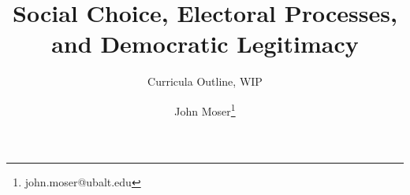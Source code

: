 \documentclass[twoside,titlepage,12pt,appendixprefix=true]{scrreprt}
\begin{document}
    \author{John Moser\thanks{john.moser@ubalt.edu}}

    \title{Social Choice, Electoral Processes, and Democratic Legitimacy}
    \subtitle{Curricula Outline, WIP}

    
    \printbibliography
    
    
    
    
    
\end{document}

